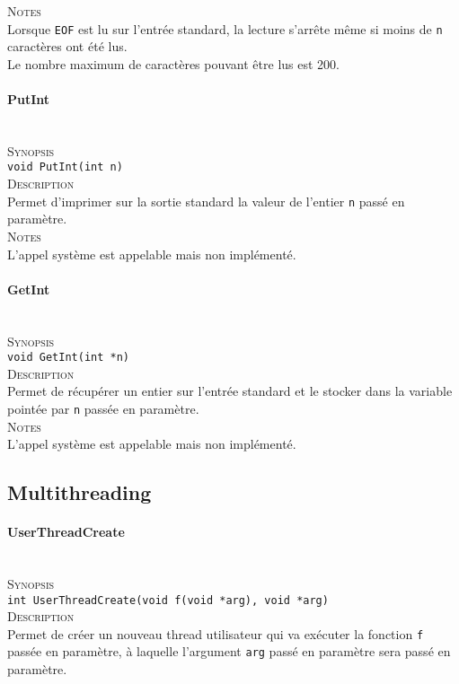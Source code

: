 \documentclass{report}
\newcommand{\myparagraph}[1]{\paragraph*{#1}\mbox{}\\}
\begin{document}
\textsc{Notes}\\
	Lorsque \texttt{EOF} est lu sur l'entrée standard, la lecture s'arrête même si moins de \texttt{n} caractères ont été lus.\\
	Le nombre maximum de caractères pouvant être lus est 200.\\
	
	
	
	
\myparagraph{PutInt}

\textsc{Synopsis}\\
	\texttt{void PutInt(int n)}\\
	
\textsc{Description}\\
	Permet d'imprimer sur la sortie standard la valeur de l'entier \texttt{n} passé en paramètre.\\
	
\textsc{Notes}\\
	L'appel système est appelable mais non implémenté.
	
	



\myparagraph{GetInt}

\textsc{Synopsis}\\
	\texttt{void GetInt(int *n)}\\
	
\textsc{Description}\\
	Permet de récupérer un entier sur l'entrée standard et le stocker dans la variable pointée par \texttt{n} passée en paramètre.\\
	
\textsc{Notes}\\
	L'appel système est appelable mais non implémenté.
	
	

\subsection*{Multithreading}
\myparagraph{UserThreadCreate}

\textsc{Synopsis}\\
	\texttt{int UserThreadCreate(void f(void *arg), void *arg)}\\
	
\textsc{Description}\\
	Permet de créer un nouveau thread utilisateur qui va exécuter la fonction \texttt{f} passée en paramètre, à laquelle l'argument \texttt{arg} passé en paramètre sera passé en paramètre.\\
	
\end{document}
